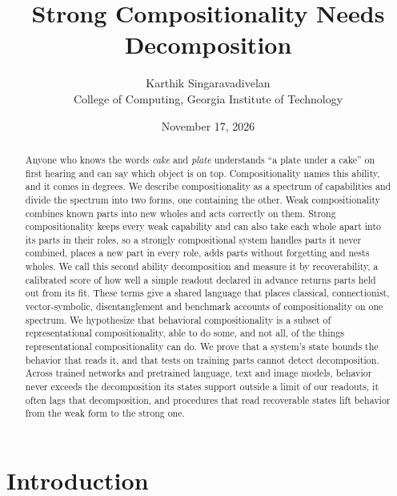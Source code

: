 \title{Strong Compositionality Needs Decomposition}
\author{Karthik Singaravadivelan\\ College of Computing, Georgia Institute of Technology}
\date{November 17, 2026}


\maketitle

\begin{abstract}
Anyone who knows the words \emph{cake} and \emph{plate} understands ``a plate under a cake'' on first hearing and can say which object is on top. Compositionality names this ability, and it comes in degrees. We describe compositionality as a spectrum of capabilities and divide the spectrum into two forms, one containing the other. Weak compositionality combines known parts into new wholes and acts correctly on them. Strong compositionality keeps every weak capability and can also take each whole apart into its parts in their roles, so a strongly compositional system handles parts it never combined, places a new part in every role, adds parts without forgetting and nests wholes. We call this second ability decomposition and measure it by recoverability, a calibrated score of how well a simple readout declared in advance returns parts held out from its fit. These terms give a shared language that places classical, connectionist, vector-symbolic, disentanglement and benchmark accounts of compositionality on one spectrum. We hypothesize that behavioral compositionality is a subset of representational compositionality, able to do some, and not all, of the things representational compositionality can do. We prove that a system's state bounds the behavior that reads it, and that tests on training parts cannot detect decomposition. Across trained networks and pretrained language, text and image models, behavior never exceeds the decomposition its states support outside a limit of our readouts, it often lags that decomposition, and procedures that read recoverable states lift behavior from the weak form to the strong one.
\end{abstract}

\section{Introduction}
\label{sec:intro}

